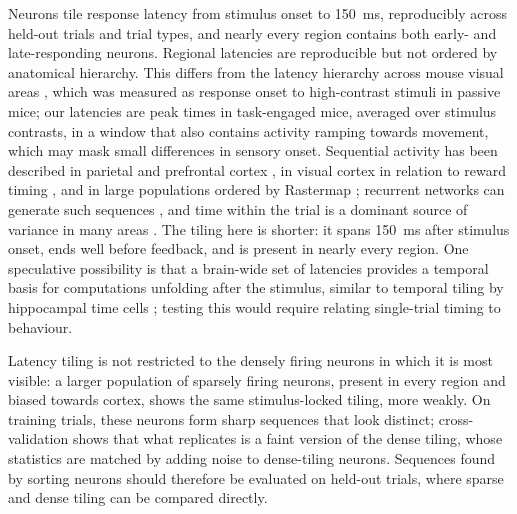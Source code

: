 \documentclass[10pt,lineno]{elife}
\begin{document}

Neurons tile response latency from stimulus onset to 150~ms, reproducibly across held-out trials and trial types, and nearly every region contains both early- and late-responding neurons. Regional latencies are reproducible but not ordered by anatomical hierarchy. This differs from the latency hierarchy across mouse visual areas \cite{siegle2021survey}, which was measured as response onset to high-contrast stimuli in passive mice; our latencies are peak times in task-engaged mice, averaged over stimulus contrasts, in a window that also contains activity ramping towards movement, which may mask small differences in sensory onset. Sequential activity has been described in parietal \cite{harvey2012choice} and prefrontal cortex \cite{fujisawa2008behavior, tiganj2017sequential}, in visual cortex in relation to reward timing \cite{shuler2006reward}, and in large populations ordered by Rastermap \cite{stringer2024rastermap}; recurrent networks can generate such sequences \cite{rajan2016recurrent}, and time within the trial is a dominant source of variance in many areas \cite{kobak2016demixed}. The tiling here is shorter: it spans 150~ms after stimulus onset, ends well before feedback, and is present in nearly every region. One speculative possibility is that a brain-wide set of latencies provides a temporal basis for computations unfolding after the stimulus, similar to temporal tiling by hippocampal time cells \cite{Pastalkova2008, macdonald2011hippocampal}; testing this would require relating single-trial timing to behaviour.

Latency tiling is not restricted to the densely firing neurons in which it is most visible: a larger population of sparsely firing neurons, present in every region and biased towards cortex, shows the same stimulus-locked tiling, more weakly. On training trials, these neurons form sharp sequences that look distinct; cross-validation shows that what replicates is a faint version of the dense tiling, whose statistics are matched by adding noise to dense-tiling neurons. Sequences found by sorting neurons should therefore be evaluated on held-out trials, where sparse and dense tiling can be compared directly.
\end{document}
